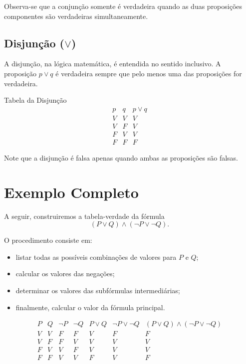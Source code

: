 \documentclass[12pt,a4paper,openright]{book}
\begin{document}
Observa-se que a conjunção somente é verdadeira quando as duas proposições componentes são verdadeiras simultaneamente.

\subsection*{Disjunção ($\lor$)}

A disjunção, na lógica matemática, é entendida no sentido inclusivo. A proposição \(p \lor q\) é verdadeira sempre que pelo menos uma das proposições for verdadeira.

\begin{block}{Tabela da Disjunção}
\[
\begin{array}{c|c|c}
p & q & p \lor q \\ \hline
V & V & V \\
V & F & V \\
F & V & V \\
F & F & F
\end{array}
\]
\end{block}

Note que a disjunção é falsa apenas quando ambas as proposições são falsas.

\section{Exemplo Completo}

A seguir, construiremos a tabela-verdade da fórmula
\[
(P \lor Q) \land (\neg P \lor \neg Q).
\]

O procedimento consiste em:
\begin{itemize}
    \item listar todas as possíveis combinações de valores para \(P\) e \(Q\);
    \item calcular os valores das negações;
    \item determinar os valores das subfórmulas intermediárias;
    \item finalmente, calcular o valor da fórmula principal.
\end{itemize}

\[
\begin{array}{c|c|c|c|c|c|c}
P & Q & \neg P & \neg Q & P \lor Q & \neg P \lor \neg Q & (P \lor Q) \land (\neg P \lor \neg Q) \\ \hline
V & V & F & F & V & F & F \\
V & F & F & V & V & V & V \\
F & V & V & F & V & V & V \\
F & F & V & V & F & V & F
\end{array}
\]
\end{document}
